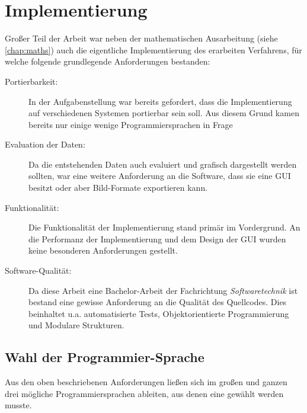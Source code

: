 \chapter{Implementierung}
\label{chap:impl}
Großer Teil der Arbeit war neben der mathematischen Ausarbeitung (siehe \autoref{chap:maths}) auch die eigentliche Implementierung des erarbeiten Verfahrens, für welche folgende grundlegende Anforderungen bestanden:

\begin{description}
\item[Portierbarkeit:] In der Aufgabenstellung war bereits gefordert, dass die Implementierung auf verschiedenen Systemen portierbar sein soll. Aus diesem Grund kamen bereits nur einige wenige Programmiersprachen in Frage
\item[Evaluation der Daten:] Da die entstehenden Daten auch evaluiert und grafisch dargestellt werden sollten, war eine weitere Anforderung an die Software, dass sie eine \gls{GUI} besitzt oder aber Bild-Formate exportieren kann.
\item[Funktionalität:] Die Funktionalität der Implementierung stand primär im Vordergrund. An die Performanz der Implementierung und dem Design der \gls{GUI} wurden keine besonderen Anforderungen gestellt.
\item[Software-Qualität:] Da diese Arbeit eine Bachelor-Arbeit der Fachrichtung \textit{Softwaretechnik} ist bestand eine gewisse Anforderung an die Qualität des Quellcodes. Dies beinhaltet u.a. automatisierte Tests, Objektorientierte Programmierung und Modulare Strukturen.
\end{description}

\section{Wahl der Programmier-Sprache}
\label{sec:language}
Aus den oben beschriebenen Anforderungen ließen sich im großen und ganzen drei mögliche Programmiersprachen ableiten, aus denen eine gewählt werden musste.

